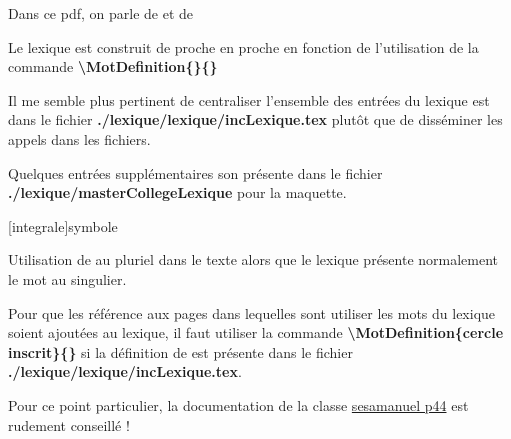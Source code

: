 \documentclass[nocrop]{../sesamanuel}
\begin{document}
Dans ce pdf, on parle de  et de 

\medskip

Le lexique est construit de proche en proche en fonction de l'utilisation de la commande \textbf{\textbackslash MotDefinition\{\}\{\}}

\medskip

Il me semble plus pertinent de centraliser l'ensemble des entrées du lexique est dans le fichier \textbf{./lexique/lexique/incLexique.tex}
plutôt que de disséminer les appels dans les fichiers.

\medskip

Quelques entrées supplémentaires son présente dans le fichier \textbf{./lexique/masterCollegeLexique} pour la maquette.

\medskip


\MotDefinition{$\int$}[integrale]{symbole}

Utilisation de  au pluriel dans le texte alors que le lexique présente normalement le mot au singulier.

\medskip

Pour que les référence aux pages dans lequelles sont utiliser les mots du lexique soient ajoutées au lexique,
il faut utiliser la commande \textbf{\textbackslash MotDefinition\{cercle inscrit\}\{\}} si la définition de  est présente dans le fichier \textbf{./lexique/lexique/incLexique.tex}.

\medskip

Pour ce point particulier, la documentation de la classe \href{https://distrib-coffee.ipsl.jussieu.fr/pub/mirrors/ctan/macros/latex/contrib/sesamanuel/sesamath-doc-fr.pdf}{sesamanuel p44} est rudement conseillé !


\AfficheLexique 
\end{document}
